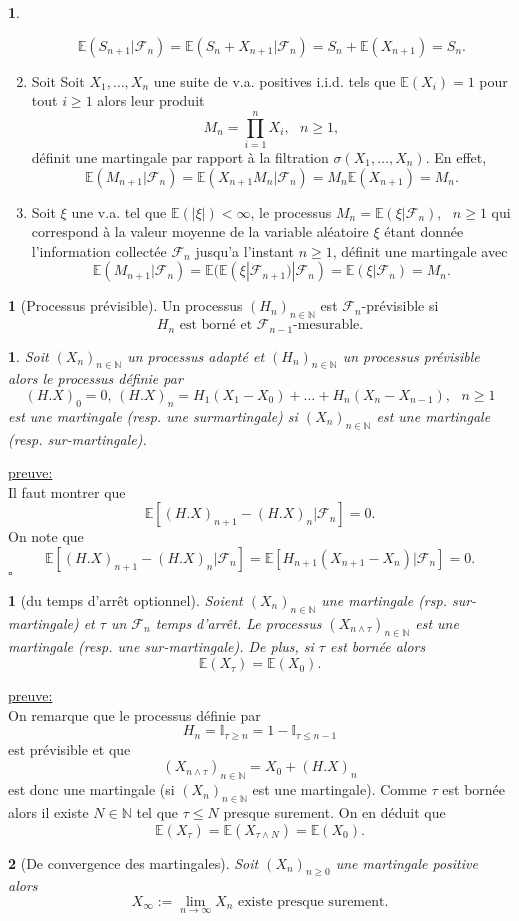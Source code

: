 \documentclass[8pt,notheorems]{beamer}
\def \E{\mathbb E}
\def \N{\mathbb N}
\newcommand{\F}{\mathcal{F}}
\newtheorem{theorem}{\translate{Theorem}}[section]
\newtheorem{theorem}{\translate{Theoreme}}
\newtheorem{prop}{\translate{Proposition}}
\theoremstyle{definition}
\newtheorem{definition}{\translate{Definition}}
\theoremstyle{example}
\newtheorem{example}{\translate{Exemple}}
\theoremstyle{mystyle}
\theoremstyle{plain}
\begin{document}
\begin{frame}[allowframebreaks]
\begin{example}
\begin{enumerate}
    $$
    \E(S_{n+1}|\F_n) =\E(S_{n}+X_{n+1}|\F_n) = S_n + \E(X_{n+1}) = S_n.
    $$
    \item Soit  Soit $X_1,\ldots, X_n$ une suite de v.a. positives i.i.d. tels que $\E(X_i) = 1$ pour tout $i\geq 1$ alors leur produit
    $$
    M_n = \prod_{i=1}^n X_i,\text{ }n\geq1,
    $$
    définit une martingale par rapport à la filtration $\sigma(X_1,\ldots, X_n)$. En effet,
    $$
    \E(M_{n+1}|\F_n) =\E(X_{n+1}M_n|\F_n) = M_n\E(X_{n+1}) = M_n.
    $$
    \item Soit $\xi$ une v.a. tel que $\E(|\xi|)<\infty$, le processus $M_n = \E(\xi|\F_n),\text{ }n\geq1$ qui correspond à la valeur moyenne de la variable aléatoire $\xi$ étant donnée l'information collectée $\F_n$ jusqu'a l'instant $n\geq1$, définit une martingale avec
    $$
    \E(M_{n+1}|\F_n) = \E(\E(\xi|\F_{n+1})|\F_n) =\E(\xi|\F_n) = M_n.
    $$
\end{enumerate}
\end{example}
\begin{definition}[Processus prévisible]
Un processus $(H_n)_{n\in\N}$ est $\mathcal{F}_n$-prévisible si
$$
H_n\text{ est borné et }\mathcal{F}_{n-1}\text{-mesurable}.
$$
\end{definition}
\begin{prop}
Soit $(X_n)_{n\in\N}$ un processus adapté et $(H_n)_{n\in\N}$ un processus prévisible alors le processus définie par
$$
(H.X)_0 =0\text{, }(H.X)_n =H_1(X_1-X_0)+\ldots+ H_n(X_n-X_{n-1}),\text{ }n\geq1
$$
est une martingale (resp. une surmartingale) si $(X_n)_{n\in\N}$ est une martingale (resp. sur-martingale).
\end{prop}
\underline{preuve:}\\
Il faut montrer que
$$
\E\left[(H.X)_{n+1} - (H.X)_{n}|\mathcal{F}_n\right]=0.
$$
On note que
$$
\E\left[(H.X)_{n+1} - (H.X)_{n}|\mathcal{F}_n\right]=\E\left[H_{n+1}(X_{n+1}-X_n)|\mathcal{F}_n\right]=0.
$$
$\square$
\begin{theorem}[du temps d'arrêt optionnel]\label{theo:temps_arret}
Soient $(X_n)_{n\in\N}$ une martingale (rsp. sur-martingale) et $\tau$ un $\mathcal{F}_n$ temps d'arrêt. Le processus $(X_{n\land \tau})_{n\in\N}$ est une martingale (resp. une sur-martingale). De plus, si $\tau$ est bornée alors
$$
\E(X_{\tau}) = \E(X_0).
$$
\end{theorem}
\underline{preuve:}\\
On remarque que le processus définie par
$$
H_{n} = \mathbb{I}_{\tau\geq n} = 1 -\mathbb{I}_{\tau\leq n-1}
$$
est prévisible et que
$$
(X_{n\land \tau})_{n\in\N} = X_0 + (H.X)_n
$$
est donc une martingale (si $(X_n)_{n\in\N}$ est une martingale). Comme $\tau$ est bornée alors il existe $N\in\N$ tel que $\tau\leq N$ presque surement. On en déduit que
$$
\E(X_{\tau})=\E(X_{\tau\land N})=\E(X_0).
$$
\begin{theorem}[De convergence des martingales]
Soit $(X_n)_{n\geq0}$ une martingale positive alors 
$$
X_\infty := \underset{n\rightarrow\infty}{\lim} X_n\text{ existe presque surement.}
$$
\end{theorem}
\end{frame}
\end{document}
